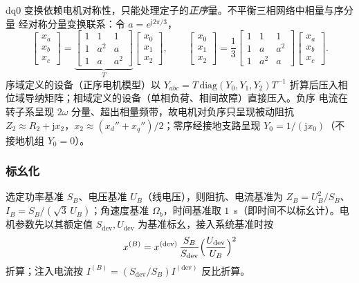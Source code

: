 \begin{remark}\label{rem:dy-th-mac-seq}
dq0 变换依赖电机对称性，只能处理定子的\emph{正序}量。不平衡三相网络中相量与序分量
经对称分量变换联系：令 $a=e^{\mathrm j2\pi/3}$，
\begin{equation}
\begin{bmatrix}x_a\\x_b\\x_c\end{bmatrix}
=\underbrace{\begin{bmatrix}1&1&1\\1&a^2&a\\1&a&a^2\end{bmatrix}}_{T}
\begin{bmatrix}x_0\\x_1\\x_2\end{bmatrix},
\qquad
\begin{bmatrix}x_0\\x_1\\x_2\end{bmatrix}
=\frac13\begin{bmatrix}1&1&1\\1&a&a^2\\1&a^2&a\end{bmatrix}
\begin{bmatrix}x_a\\x_b\\x_c\end{bmatrix}.
\end{equation}
序域定义的设备（正序电机模型）以 $Y_{abc}=T\,\mathrm{diag}(Y_0,Y_1,Y_2)T^{-1}$
折算后压入相位域导纳矩阵；相域定义的设备（单相负荷、相间故障）直接压入。负序
电流在转子系呈现 $2\omega$ 分量、超出相量频带，故电机对负序只呈现被动阻抗
$Z_2\approx R_2+\mathrm jx_2$，$x_2\approx(x_d''+x_q'')/2$；零序经接地支路呈现
$Y_0=1/(\mathrm jx_0)$（不接地机组 $Y_0=0$）。
\end{remark}

\subsubsection{标幺化}

\begin{definition}[标幺制]\label{def:dy-th-mac-pu}
选定功率基准 $S_B$、电压基准 $U_B$（线电压），则阻抗、电流基准为
$Z_B=U_B^2/S_B$、$I_B=S_B/(\sqrt3\,U_B)$；角速度基准 $\Omega_b$，时间基准取
$1$~s（即时间不以标幺计）。电机参数先以其额定值 $S_{\mathrm{dev}},U_{\mathrm{dev}}$
为基准标幺，接入系统基准时按
\begin{equation}
x^{(B)}=x^{(\mathrm{dev})}\,\frac{S_B}{S_{\mathrm{dev}}}
\Bigl(\frac{U_{\mathrm{dev}}}{U_B}\Bigr)^2
\label{eq:dy-th-mac-baseconv}
\end{equation}
折算；注入电流按 $I^{(B)}=(S_{\mathrm{dev}}/S_B)I^{(\mathrm{dev})}$ 反比折算。
\end{definition}

